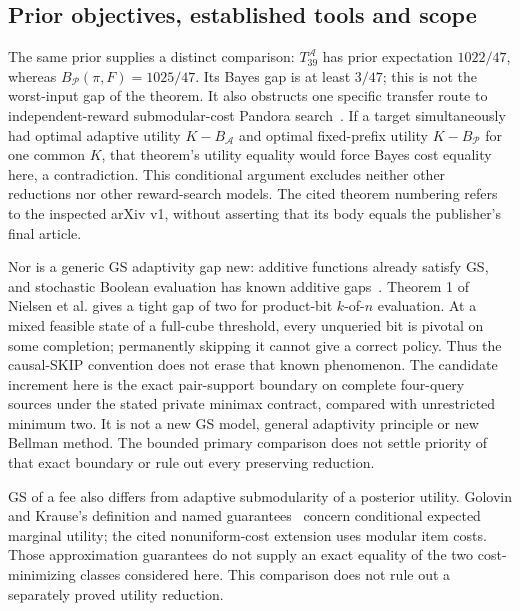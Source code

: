 \subsection{Prior objectives, established tools and scope}
The same prior supplies a distinct comparison:
$T_{39}^{\mathcal A}$ has prior expectation $1022/47$, whereas
$B_{\mathcal P}(\pi,F)=1025/47$. Its Bayes gap is at least $3/47$;
this is not the worst-input gap of the theorem. It also obstructs
one specific transfer route to independent-reward submodular-cost
Pandora search~\cite[Theorem 4.1, arXiv version]{pandora}.
If a target simultaneously had optimal adaptive utility
$K-B_{\mathcal A}$ and optimal fixed-prefix utility
$K-B_{\mathcal P}$ for one common $K$, that theorem's utility
equality would force Bayes cost equality here, a contradiction.
This conditional argument excludes neither other reductions nor
other reward-search models. The cited theorem numbering refers
to the inspected arXiv v1, without asserting that its body equals
the publisher's final article.

Nor is a generic GS adaptivity gap new: additive functions already
satisfy GS, and stochastic Boolean evaluation has known additive
gaps~\cite{hellerstein2022adaptivity,nielsen2025kofn}.
Theorem 1 of Nielsen et al. gives a tight gap of two for product-bit
$k$-of-$n$ evaluation. At a mixed feasible state of a full-cube
threshold, every unqueried bit is pivotal on some completion;
permanently skipping it cannot give a correct policy. Thus the
causal-SKIP convention does not erase that known phenomenon.
The candidate increment here is the exact pair-support boundary
on complete four-query sources under the stated private minimax
contract, compared with unrestricted minimum two. It is not a
new GS model, general adaptivity principle or new Bellman method.
The bounded primary comparison does not settle priority of that
exact boundary or rule out every preserving reduction.

GS of a fee also differs from adaptive submodularity of a
posterior utility. Golovin and Krause's definition and named
guarantees~\cite[Definition 3 and Theorem 5]{golovin2017adaptive}
concern conditional expected marginal utility; the cited
nonuniform-cost extension uses modular item costs. Those
approximation guarantees do not supply an exact equality of
the two cost-minimizing classes considered here. This comparison
does not rule out a separately proved utility reduction.

